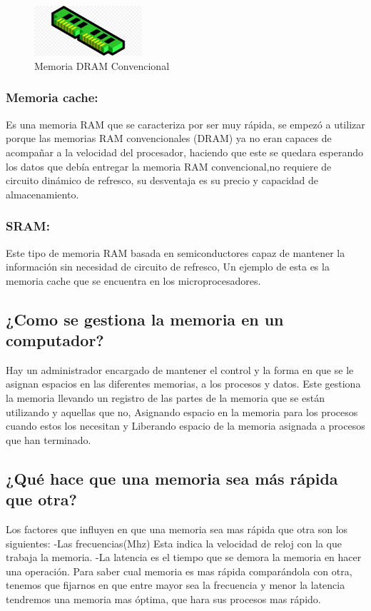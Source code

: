 \documentclass{article}
\begin{document}
\begin{figure}[h]
\includegraphics[width=4cm]{RAMM.png}
\centering
\caption{Memoria DRAM Convencional}
\label{fig:RAMM}
\end{figure}

\subsubsection{Memoria cache:}
Es una memoria RAM que se caracteriza por ser muy rápida, se empezó a utilizar porque las memorias RAM convencionales (DRAM) ya no eran capaces de acompañar a la velocidad del procesador, haciendo que este se quedara esperando los datos que debía entregar la memoria RAM convencional,no requiere de circuito dinámico de refresco, su desventaja es su precio y capacidad de almacenamiento.
\subsubsection{SRAM:}
Este tipo de memoria RAM basada en semiconductores capaz de mantener la información sin necesidad de circuito de refresco, Un ejemplo de esta es la memoria cache que se encuentra en los microprocesadores.
\subsection{¿Como se gestiona la memoria en un computador?}
Hay un administrador encargado de mantener el control y la forma en que se le asignan espacios en las diferentes memorias, a los procesos y datos. Este gestiona la memoria llevando un registro de las partes de la memoria que se están utilizando y aquellas que no, Asignando espacio en la memoria para los procesos cuando estos los necesitan y Liberando espacio de la memoria asignada a procesos que han terminado. 
\subsection{¿Qué hace que una memoria sea más rápida que otra?}
Los factores que influyen en que una memoria sea mas rápida que otra son los siguientes:
-Las frecuencias(Mhz) Esta indica la velocidad de reloj con la que trabaja la memoria.
-La latencia es el tiempo que se demora la memoria en hacer una operación.
Para saber cual memoria es mas rápida comparándola con otra, tenemos que fijarnos en que entre mayor sea la frecuencia y menor la latencia tendremos una memoria mas óptima, que hara sus procesos mas rápido.
\end{document}
